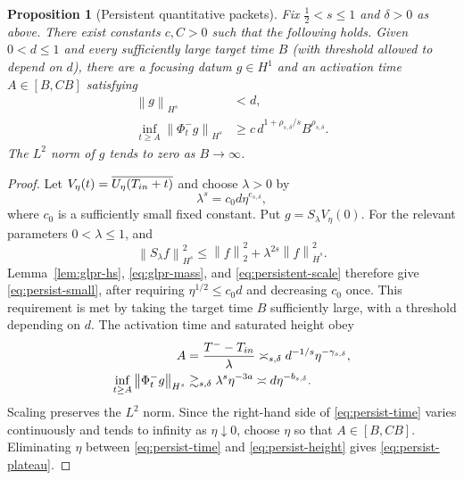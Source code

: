 \documentclass[10pt,a4paper]{amsart}
\numberwithin{equation}{section}
\newtheorem{proposition}[theorem]{Proposition}
\newcommand{\half}{\frac12}
\newcommand{\norm}[1]{\left\lVert #1\right\rVert}
\newcommand{\flow}[1]{\Phi^{#1}}
\begin{document}
\begin{proposition}[Persistent quantitative packets]\label{prop:persistent}
Fix $\half<s\leq1$ and $\delta>0$ as above.  There exist constants
$c,C>0$ such that the following holds.  Given $0<d\leq1$ and every
sufficiently large target time $B$ (with threshold allowed to depend on
$d$), there are a focusing datum $g\in H^1$
and an activation time $A\in[B,CB]$ satisfying
\begin{align}
 \norm g_{H^s}&<d,\label{eq:persist-small}\\
 \inf_{t\geq A}\norm{\flow-_tg}_{H^s}
 &\geq c\,d^{1+\rho_{s,\delta}/s}B^{\rho_{s,\delta}}.
 \label{eq:persist-plateau}
\end{align}
The $L^2$ norm of $g$ tends to zero as $B\to\infty$.
\end{proposition}

\begin{proof}
Let $V_\eta(t)=\overline{U_\eta(T_{\rm in}+t)}$ and choose
$\lambda>0$ by
\begin{equation}\label{eq:persistent-scale}
 \lambda^s=c_0d\eta^{e_{s,\delta}},
\end{equation}
where $c_0$ is a sufficiently small fixed constant.  Put
$g=S_\lambda V_\eta(0)$.  For the relevant parameters $0<\lambda\leq1$, and
\begin{equation}\label{eq:inhomogeneous-small-scale}
 \norm{S_\lambda f}_{H^s}^2
 \leq \norm f_2^2+\lambda^{2s}\norm f_{\dot H^s}^2.
\end{equation}
Lemma~\ref{lem:glpr-hs}, \eqref{eq:glpr-mass}, and
\eqref{eq:persistent-scale} therefore give \eqref{eq:persist-small}, after
requiring $\eta^{1/2}\leq c_0d$ and decreasing $c_0$ once.  This requirement
is met by taking the target time $B$ sufficiently large, with a threshold
depending on $d$.
The activation time and saturated height obey
\begin{align}
 A&=\frac{T^--T_{\rm in}}\lambda
 \asymp_{s,\delta}d^{-1/s}\eta^{-\gamma_{s,\delta}},
 \label{eq:persist-time}\\
 \inf_{t\geq A}\norm{\flow-_tg}_{H^s}
 &\gtrsim_{s,\delta}
 \lambda^s\eta^{-3a}
 \asymp d\eta^{-b_{s,\delta}}.
 \label{eq:persist-height}
\end{align}
Scaling preserves the $L^2$ norm.  Since the right-hand side of
\eqref{eq:persist-time} varies continuously and tends to infinity as
$\eta\downarrow0$, choose $\eta$ so that $A\in[B,CB]$.  Eliminating $\eta$
between \eqref{eq:persist-time} and \eqref{eq:persist-height} gives
\eqref{eq:persist-plateau}.
\end{proof}
\end{document}
